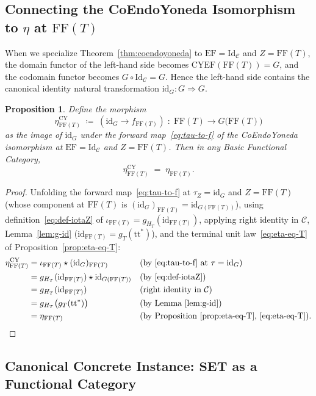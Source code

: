 \documentclass[11pt,a4paper]{article}
\newtheorem{proposition}[theorem]{Proposition}
\theoremstyle{definition}
\theoremstyle{remark}
\newcommand{\Set}{\mathbf{SET}}
\newcommand{\Id}{\mathrm{Id}}
\newcommand{\id}{\mathrm{id}}
\newcommand{\CYEF}{\mathrm{CYEF}}
\newcommand{\FF}{\mathrm{FF}}
\newcommand{\EF}{\mathrm{EF}}
\newcommand{\ttstar}{\mathrm{tt}^*}
\begin{document}
\subsection{Connecting the CoEndoYoneda Isomorphism to $\eta$ at $\FF(T)$}

When we specialize Theorem~\ref{thm:coendoyoneda} to $\EF = \Id_{\mathcal{C}}$ and $Z = \FF(T)$, the
domain functor of the left-hand side becomes $\CYEF(\FF(T)) = G$, and the codomain functor becomes
$G \circ \Id_{\mathcal{C}} = G$. Hence the left-hand side contains the canonical identity natural
transformation $\id_G : G \Rightarrow G$.

\begin{proposition}\label{prop:origin-eta}
Define the morphism
\[
  \eta_{\FF(T)}^{\mathrm{CY}} \;\coloneqq\; (\id_G \to f_{\FF(T)})
  \;:\; \FF(T) \longrightarrow G\bigl(\FF(T)\bigr)
\]
as the image of $\id_G$ under the forward map~\eqref{eq:tau-to-f} of the CoEndoYoneda isomorphism at
$\EF = \Id_{\mathcal{C}}$ and $Z = \FF(T)$. Then in any Basic Functional Category,
\[
  \eta_{\FF(T)}^{\mathrm{CY}} \;=\; \eta_{\FF(T)}.
\]
\end{proposition}

\begin{proof}
Unfolding the forward map~\eqref{eq:tau-to-f} at $\tau_Z = \id_G$ and $Z = \FF(T)$ (whose component at
$\FF(T)$ is $(\id_G)_{\FF(T)} = \id_{G(\FF(T))}$), using definition~\eqref{eq:def-iotaZ} of
$\iota_{\FF(T)} = g_{H_T}(\id_{\FF(T)})$, applying right identity in $\mathcal{C}$, Lemma~\ref{lem:g-id}
($\id_{\FF(T)} = g_T(\ttstar)$), and the terminal unit law~\eqref{eq:eta-eq-T} of
Proposition~\ref{prop:eta-eq-T}:
\begin{align*}
  \eta_{\FF(T)}^{\mathrm{CY}}
  &= \iota_{\FF(T)} \star (\id_G)_{\FF(T)}
    &&\text{(by \eqref{eq:tau-to-f} at $\tau = \id_G$)} \\
  &= g_{H_T}(\id_{\FF(T)}) \star \id_{G(\FF(T))}
    &&\text{(by \eqref{eq:def-iotaZ})} \\
  &= g_{H_T}(\id_{\FF(T)})
    &&\text{(right identity in $\mathcal{C}$)} \\
  &= g_{H_T}\bigl(g_T(\ttstar)\bigr)
    &&\text{(by Lemma~\ref{lem:g-id})} \\
  &= \eta_{\FF(T)}
    &&\text{(by Proposition~\ref{prop:eta-eq-T}, \eqref{eq:eta-eq-T})}.
  \qedhere
\end{align*}
\end{proof}

\subsection{Canonical Concrete Instance: $\Set$ as a Functional Category}
\end{document}
